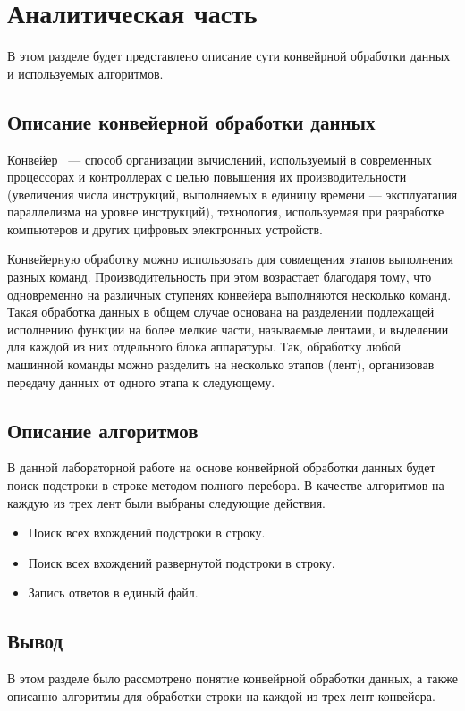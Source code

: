 \chapter{Аналитическая часть}
В этом разделе будет представлено описание сути конвейрной обработки данных и используемых алгоритмов.

\section{Описание конвейерной обработки данных}

Конвейер~\cite{bib1} — способ организации вычислений, используемый в современных процессорах и контроллерах с целью повышения их производительности (увеличения числа инструкций, выполняемых в единицу времени — эксплуатация параллелизма на уровне инструкций), технология, используемая при разработке компьютеров и других цифровых электронных устройств.

Конвейерную обработку можно использовать для совмещения этапов выполнения разных команд.
Производительность при этом возрастает благодаря тому, что одновременно на различных ступенях конвейера выполняются несколько команд. 
Такая обработка данных в общем случае основана на разделении подлежащей исполнению функции на более мелкие части, называемые лентами, и выделении для каждой из них отдельного блока аппаратуры. 
Так, обработку любой машинной команды можно разделить на несколько этапов (лент), организовав передачу данных от одного этапа к следующему.

\section{Описание алгоритмов}

В данной лабораторной работе на основе конвейрной обработки данных будет поиск подстроки в строке методом полного перебора. 
В качестве алгоритмов на каждую из трех лент были выбраны следующие действия.

\begin{itemize}[label=---]
    \item Поиск всех вхождений подстроки в строку.
    \item Поиск всех вхождений развернутой подстроки в строку.
    \item Запись ответов в единый файл.
\end{itemize}

\section*{Вывод}

В этом разделе было рассмотрено понятие конвейрной обработки данных, а также описанно алгоритмы для обработки строки на каждой из трех лент конвейера.
